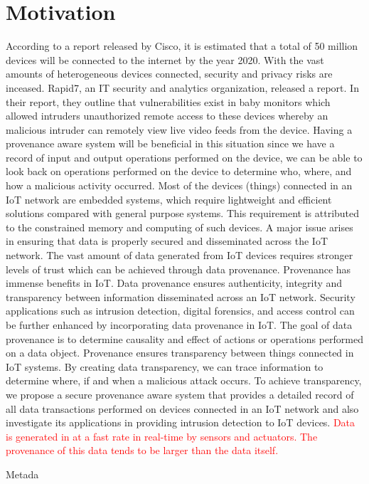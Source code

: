 \section{Motivation}
According to a report released by Cisco, it is estimated that a total of 50 million devices will be
connected to the internet by the year 2020. With the vast amounts of heterogeneous devices connected,
security and privacy risks are inceased. Rapid7, an  IT security and analytics organization, released a report. In their report, they outline that vulnerabilities exist in
baby monitors which allowed intruders unauthorized remote access to these devices
whereby an malicious intruder can remotely view live video feeds from the device. Having a provenance aware
system will be beneficial in this situation since we have a record of input and output
operations performed on the device, we can be able to look back on operations
performed on the device to determine who, where, and how a malicious activity
occurred. Most of the devices (things) connected in an IoT network are embedded systems, which
require lightweight and efficient solutions compared with general purpose
systems.
This requirement is attributed to the constrained memory and computing of such
devices. A major issue arises in ensuring that data is properly secured and
disseminated across the IoT network. The vast amount of data generated from IoT
devices requires stronger levels of trust which can be achieved through data
provenance. Provenance has immense benefits in IoT. Data provenance ensures
authenticity, integrity and transparency between information disseminated across an
IoT network. Security applications such as intrusion detection, digital forensics, and
access control can be further enhanced by incorporating data provenance in IoT. The goal of data provenance is to determine causality and effect of actions or
operations performed on a data object. Provenance ensures transparency between things
connected in IoT systems. By creating data transparency, we can trace information to
determine where, if and when a malicious attack occurs. To achieve transparency, we
propose a secure provenance aware system that provides a detailed record of all data
transactions performed on devices connected in an IoT network and also investigate its applications in providing intrusion detection to IoT devices.  \textcolor{red}{Data is generated in at a fast rate in real-time by sensors and actuators. The provenance of this data tends to be larger than the data itself.}

Metada

